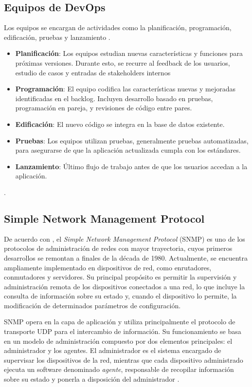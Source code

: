 \documentclass[12pt,a4paper]{article}
\begin{document}
\subsection{Equipos de DevOps}

Los equipos se encargan de actividades como la planificación, programación, edificación, pruebas y lanzamiento \parencite{atlassian2026devops}.

\begin{itemize}
    \item \textbf{Planificación}: Los equipos estudian nuevas características y funciones para próximas versiones. Durante esto, se recurre al feedback de los usuarios, estudio de casos y entradas de stakeholders internos
    \item \textbf{Programación}: El equipo codifica las características nuevas y mejoradas identificadas en el backlog. Incluyen desarrollo basado en pruebas, programación en pareja, y revisiones de código entre pares.
    \item \textbf{Edificación}: El nuevo código se integra en la base de datos existente.
    \item \textbf{Pruebas}: Los equipos utilizan pruebas, generalmente pruebas automatizadas, para asegurarse de que la aplicación actualizada cumpla con los estándares.
    \item \textbf{Lanzamiento}: Último flujo de trabajo antes de que los usuarios accedan a la aplicación.
\end{itemize}. 

\subsection{Simple Network Management Protocol}

De acuerdo con \textcite{harrington2002snmp}, el \textit{Simple Network Management Protocol} (SNMP) es uno de los protocolos de administración de redes con mayor trayectoria, cuyos primeros desarrollos se remontan a finales de la década de 1980. Actualmente, se encuentra ampliamente implementado en dispositivos de red, como enrutadores, conmutadores y servidores. Su principal propósito es permitir la supervisión y administración remota de los dispositivos conectados a una red, lo que incluye la consulta de información sobre su estado y, cuando el dispositivo lo permite, la modificación de determinados parámetros de configuración.

SNMP opera en la capa de aplicación y utiliza principalmente el protocolo de transporte UDP para el intercambio de información. Su funcionamiento se basa en un modelo de administración compuesto por dos elementos principales: el administrador y los agentes. El administrador es el sistema encargado de supervisar los dispositivos de la red, mientras que cada dispositivo administrado ejecuta un software denominado \textit{agente}, responsable de recopilar información sobre su estado y ponerla a disposición del administrador \parencite{harrington2002snmp}.
\end{document}
